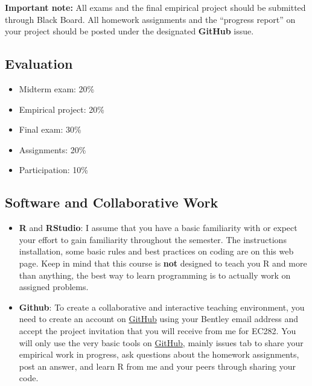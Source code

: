 \documentclass[
]{book}
\providecommand{\tightlist}{%
  \setlength{\itemsep}{0pt}\setlength{\parskip}{0pt}}
\begin{document}
\textbf{Important note:} All exams and the final empirical project should be submitted through Black Board. All homework assignments and the ``progress report'' on your project should be posted under the designated \textbf{GitHub} issue.

\hypertarget{evaluation}{%
\subsection*{Evaluation}\label{evaluation}}

\begin{itemize}
\tightlist
\item
  Midterm exam: 20\%
\item
  Empirical project: 20\%
\item
  Final exam: 30\%
\item
  Assignments: 20\%
\item
  Participation: 10\%
\end{itemize}

\hypertarget{software-and-collaborative-work}{%
\subsection*{Software and Collaborative Work}\label{software-and-collaborative-work}}

\begin{itemize}
\item
  \textbf{R} and \textbf{RStudio}: I assume that you have a basic familiarity with or expect your effort to gain familiarity throughout the semester. The instructions installation, some basic rules and best practices on coding are on this web page. Keep in mind that this course is \textbf{not} designed to teach you R and more than anything, the best way to learn programming is to actually work on assigned problems.
\item
  \textbf{Github}: To create a collaborative and interactive teaching environment, you need to create an account on \href{https://github.com/}{GitHub} using your Bentley email address and accept the project invitation that you will receive from me for EC282. You will only use the very basic tools on \href{https://github.com/}{GitHub}, mainly issues tab to share your empirical work in progress, ask questions about the homework assignments, post an answer, and learn R from me and your peers through sharing your code.
\end{itemize}
\end{document}
